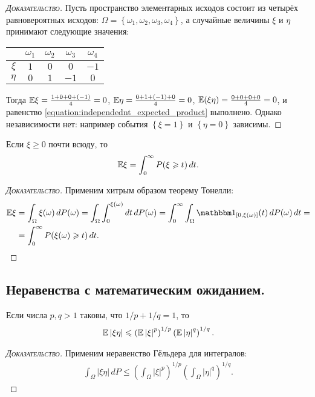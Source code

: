 \documentclass[../main.tex]{subfiles}
\begin{document}
\begin{proof}[\normalfont\textsc{Доказательство}]
 Пусть пространство элементарных исходов состоит из четырёх равновероятных исходов: $ \Omega = \left\{ \omega_1, \omega_2, \omega_3, \omega_4 \right\} $, а случайные величины $ \xi $ и $ \eta $ принимают следующие значения:
 \begin{center}
  \begin{tabular}{r|cccc}
   & $\omega_1$ & $\omega_2$ & $\omega_3$ & $\omega_4$ \\
   \hline
   $\xi$ & $ 1 $ & $0$ & $0$ & $-1$ \\
   $\eta$ & $0$ & $1$ & $-1$ & $0$
  \end{tabular}
 \end{center}
 Тогда  $ \mathbb E \xi = \frac{1 + 0 + 0 + (-1)}{4} = 0 $, $ \mathbb E\eta = \frac{0 + 1 + (-1) + 0}{4} = 0 $, $ \mathbb E (\xi \eta) = \frac{0 + 0 + 0 + 0}{4} = 0 $, и равенство \eqref{equation:independednt_expected_product} выполнено. Однако независимости нет: например события $ \left\{ \xi=1 \right\} $ и $ \left\{ \eta = 0 \right\} $ зависимы.
\end{proof}

\begin{prop}
 Если $ \xi \geqslant 0 $ почти всюду, то
 \begin{align*}
  \mathbb E\xi = \int_{0}^{\infty} P(\xi \geqslant t)\,dt.
 \end{align*} 
\end{prop}
\begin{proof}[\normalfont\textsc{Доказательство}]
 Применим хитрым образом теорему Тонелли:
 \begin{align*}
  \E\xi &= \int_{\Omega} \xi(\omega)\,dP(\omega) = \int_{\Omega} \int_{0}^{\xi(\omega)} dt\,dP(\omega) = \int_{0}^{\infty} \int_{\Omega}   \Ind_{[0, \xi(\omega)]}(t)\,dP(\omega)\,dt = \\
  &= \int_{0}^{\infty} P(\xi(\omega) \geqslant t)\,dt.
 \end{align*} 
\end{proof}

\subsection{Неравенства с математическим ожиданием.}

\begin{prop}
 \label{proposition:gulder_inequality}
 Если числа $ p, q > 1 $ таковы, что $ 1/p+1/q = 1 $, то
 \begin{align}
  \label{equation:holder_inequality}
  \mathbb E\left|\xi\eta\right| \leqslant \left( \mathbb E \left| \xi \right|^{p} \right)^{1/p} \left( \mathbb E \left| \eta \right|^{q} \right)^{1/q}.
 \end{align} 
\end{prop}
\begin{proof}[\normalfont\textsc{Доказательство}]
 Применим неравенство Гёльдера для интегралов:
 \begin{align*}
  \int_{\Omega} \left|\xi \eta \right|\,dP \leqslant \left( \int_{\Omega} \left| \xi \right|^{p}  \right)^{1 / p} \left( \int_{\Omega} \left| \eta \right|^{q}  \right)^{1 / q}.
 \end{align*}
\end{proof}
\end{document}
